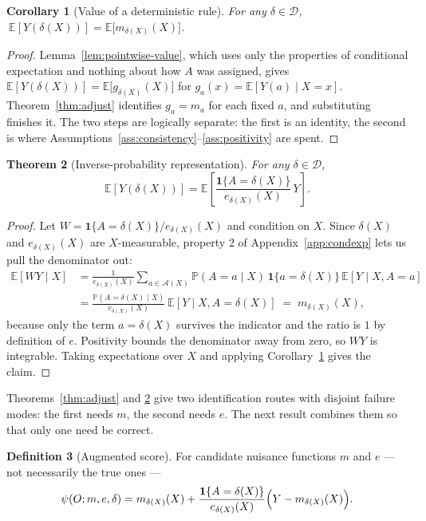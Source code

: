 \documentclass[11pt,a4paper]{article}
\theoremstyle{plain}
\newtheorem{theorem}{Theorem}[section]
\newtheorem{corollary}[theorem]{Corollary}
\theoremstyle{definition}
\newtheorem{definition}[theorem]{Definition}
\theoremstyle{remark}
\newcommand{\E}{\mathbb E}
\newcommand{\Prob}{\mathbb P}
\newcommand{\one}[1]{\mathbf 1\{#1\}}
\begin{document}
\begin{corollary}[Value of a deterministic rule]\label{cor:value}
For any $\delta\in\mathcal D$, $\ \E[Y(\delta(X))]=\E\bigl[m_{\delta(X)}(X)\bigr]$.
\end{corollary}

\begin{proof}
Lemma~\ref{lem:pointwise-value}, which uses only the properties of conditional expectation and
nothing about how $A$ was assigned, gives $\E[Y(\delta(X))]=\E\bigl[g_{\delta(X)}(X)\bigr]$ for
$g_a(x)=\E[Y(a)\mid X=x]$. Theorem~\ref{thm:adjust} identifies $g_a=m_a$ for each fixed $a$, and
substituting finishes it. The two steps are logically separate: the first is an identity, the
second is where Assumptions~\ref{ass:consistency}--\ref{ass:positivity} are spent.
\end{proof}

\begin{theorem}[Inverse-probability representation]\label{thm:ipw}
For any $\delta\in\mathcal D$,
\[
\E[Y(\delta(X))]
=\E\left[\frac{\one{A=\delta(X)}}{e_{\delta(X)}(X)}\,Y\right].
\]
\end{theorem}

\begin{proof}
Let $W=\one{A=\delta(X)}/e_{\delta(X)}(X)$ and condition on $X$. Since $\delta(X)$ and
$e_{\delta(X)}(X)$ are $X$-measurable, property 2 of Appendix~\ref{app:condexp} lets us pull the
denominator out:
\begin{align*}
\E[WY\mid X]
&= \frac{1}{e_{\delta(X)}(X)}\sum_{a\in\mathcal A(X)}\Prob(A=a\mid X)\,\one{a=\delta(X)}\,\E[Y\mid X,A=a]\\
&= \frac{\Prob(A=\delta(X)\mid X)}{e_{\delta(X)}(X)}\ \E[Y\mid X,A=\delta(X)]
\;=\; m_{\delta(X)}(X),
\end{align*}
because only the term $a=\delta(X)$ survives the indicator and the ratio is $1$ by definition of
$e$. Positivity bounds the denominator away from zero, so $WY$ is integrable. Taking expectations
over $X$ and applying Corollary~\ref{cor:value} gives the claim.
\end{proof}

Theorems~\ref{thm:adjust} and \ref{thm:ipw} give two identification routes with disjoint failure
modes: the first needs $m$, the second needs $e$. The next result combines them so that only one
need be correct.

\begin{definition}[Augmented score]\label{def:aipw}
For candidate nuisance functions $m$ and $e$ --- not necessarily the true ones ---
\begin{equation}
\psi(O;m,e,\delta)
= m_{\delta(X)}(X)
+ \frac{\one{A=\delta(X)}}{e_{\delta(X)}(X)}\Bigl(Y-m_{\delta(X)}(X)\Bigr).
\label{eq:aipw}
\end{equation}
\end{definition}
\end{document}

